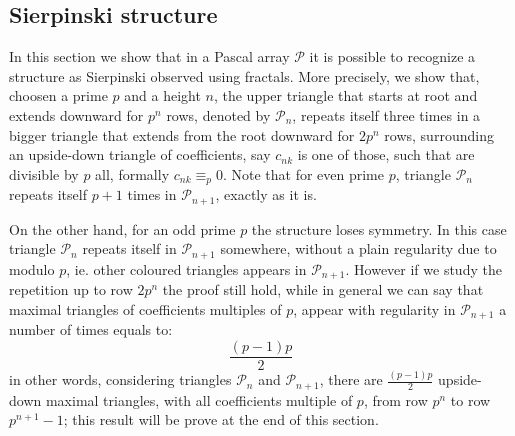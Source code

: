 \documentclass[11pt,a4paper]{article} %
\begin{document}
    \subsection{Sierpinski structure}

    In this section we show that in a Pascal array $\mathcal{P}$ it is
    possible to recognize a structure as Sierpinski observed using
    fractals. More precisely, we show that, choosen a prime $p$ and a
    height $n$, the upper triangle that starts at root and extends
    downward for $p^n$ rows, denoted by $\mathcal{P}_n$, repeats
    itself three times in a bigger triangle that extends from the root
    downward for $2p^{n}$ rows, surrounding an upside-down triangle of
    coefficients, say $c_{nk}$ is one of those, such that are divisible
    by $p$ all, formally $c_{nk} \equiv_p 0$. Note that for even prime
    $p$, triangle $\mathcal{P}_n$ repeats itself $p+1$ times in
    $\mathcal{P}_{n+1}$, exactly as it is.
    
    On the other hand, for an odd prime $p$ the structure loses
    symmetry. In this case triangle $\mathcal{P}_n$ repeats itself in
    $\mathcal{P}_{n+1}$ somewhere, without a plain regularity due to
    modulo $p$, ie. other coloured triangles appears in
    $\mathcal{P}_{n+1}$.  However if we study the repetition up to row
    $2p^n$ the proof still hold, while in general we can say that
    maximal triangles of coefficients multiples of $p$, appear with regularity
    in $\mathcal{P}_{n+1}$ a number of times equals to:
    \begin{displaymath}
        \frac{(p-1)p}{2}
    \end{displaymath}
    in other words, considering triangles $\mathcal{P}_{n}$ and
    $\mathcal{P}_{n+1}$, there are $\frac{(p-1)p}{2}$ upside-down
    maximal triangles, with all coefficients multiple of $p$, from row $p^n$
    to row $p^{n+1}-1$; this result will be prove at the end of this 
    section.
\end{document}
